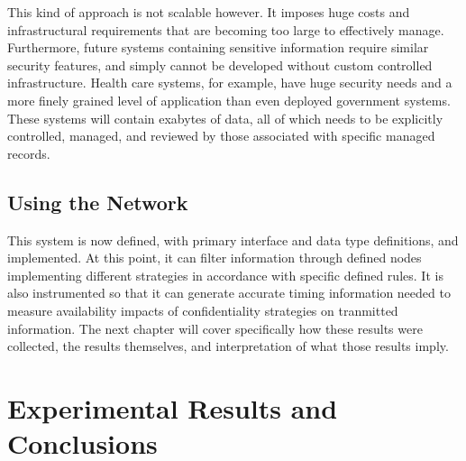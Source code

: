 \documentclass[botnum,fleqn,final]{unmeethesis}
\begin{document}
This kind of approach is not scalable however.  It imposes huge costs and infrastructural requirements that are becoming too large to effectively manage.  Furthermore, future systems containing sensitive information require similar security features, and simply cannot be developed without custom controlled infrastructure.  Health care systems, for example, have huge security needs and a more finely grained level of application than even deployed government systems.  These systems will contain exabytes of data, all of which needs to be explicitly controlled, managed, and reviewed by those associated with specific managed records.


\section{Using the Network}
This system is now defined, with primary interface and data type definitions, and implemented.  At this point, it can filter information through defined nodes implementing different strategies in accordance with specific defined rules.  It is also instrumented so that it can generate accurate timing information needed to measure availability impacts of confidentiality strategies on tranmitted information.  The next chapter will cover specifically how these results were collected, the results themselves, and interpretation of what those results imply.

\chapter{Experimental Results and Conclusions}



\pagebreak



\end{document}
